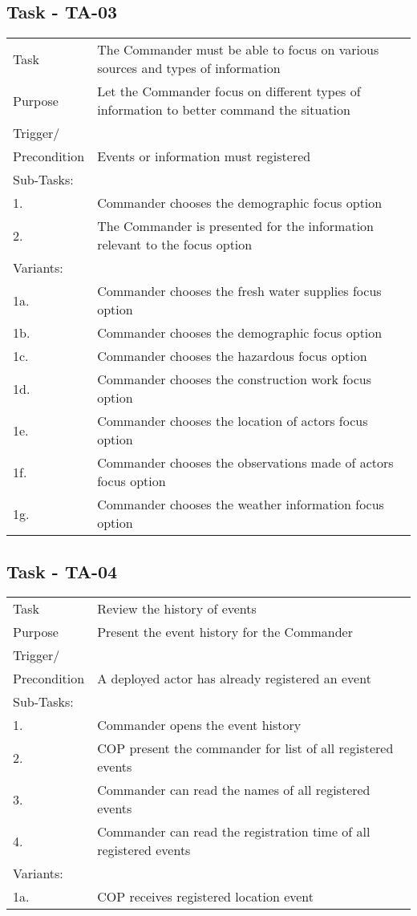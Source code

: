 \subsection{Task - TA-03}
\begin{longtable}{| p{2.5cm}  | p{10cm} |  }
	\hline
	Task & The Commander must be able to focus on various sources and types of information  \\
	Purpose & Let the Commander focus on different types of information to better command the situation \\
	Trigger/ &  \\ Precondition & Events or information must registered \\
	\hline
	Sub-Tasks: & \\
	1. & Commander chooses the demographic focus option \\
	2. & The Commander is presented for the information relevant to the focus option \\
	\hline
	Variants: & \\
	1a. & Commander chooses the fresh water supplies focus option  \\
	1b. & Commander chooses the demographic focus option  \\
	1c. & Commander chooses the hazardous focus option  \\
	1d. & Commander chooses the construction work focus option  \\
	1e. & Commander chooses the location of actors focus option  \\
	1f. & Commander chooses the observations made of actors focus option \\
	1g. & Commander chooses the weather information focus option  \\
	\hline
\end{longtable}

\FloatBarrier
\newpage


\subsection{Task - TA-04}

\begin{longtable}{| p{2.5cm}  | p{10cm} |  }
	\hline
	Task & Review the history of events \\
	Purpose & Present the event history for the Commander \\
	Trigger/ &  \\ Precondition & A deployed actor has already registered an event \\
	\hline
	Sub-Tasks: & \\
	1. & Commander opens the event history \\
	2. & COP present the commander for list of all registered events  \\
	3. & Commander can read the names of all registered events \\
	4. & Commander can read the registration time of all registered events \\
	\hline
	Variants: & \\
	1a. & COP receives registered location event \\
	\hline
\end{longtable}

